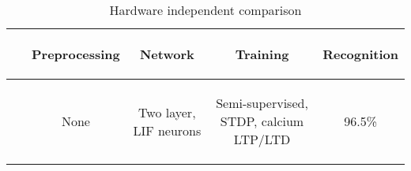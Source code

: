 \begin{table*}[hbt!]
  \caption{Hardware independent comparison}
  \begin{center}
    \bgroup
    \def\arraystretch{1.5}
    \begin{tabular}{ l c c c c }
      $ $ &
      \begin{mycell}{1.9cm}Preprocessing\end{mycell} & 
      \begin{mycell}{3.5cm} Network\end{mycell} & 
      \begin{mycell}{3.5cm} Training \end{mycell} & 
      \begin{mycell}{3.5cm} Recognition \end{mycell} \\
      \hline

      \begin{mycell}{2.5cm}~\cite{brader2007learning} \end{mycell} & 
      \begin{mycell}{1.9cm} None \end{mycell} & %
      \begin{mycell}{3.5cm} Two layer, LIF neurons\end{mycell}&  %
      \begin{mycell}{3.5cm} Semi-supervised, STDP, calcium LTP/LTD\end{mycell}&  %
      \begin{mycell}{3.5cm} 96.5\% \end{mycell} \\%
      

\end{tabular}
\end{center}
\end{table*}
